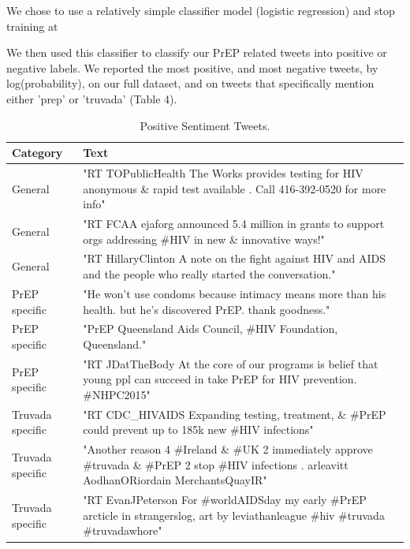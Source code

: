 \documentclass{sig-alternate-05-2015}
\begin{document}
 We chose to use a relatively simple classifier model (logistic regression) and stop training at

We then used this classifier to classify our PrEP related tweets into positive or negative labels. We reported the most positive, and most negative tweets, by log(probability), on our full dataset, and on tweets that specifically mention either 'prep' or 'truvada' (Table 4).

\begin{table}
\centering
\caption{Positive Sentiment Tweets.}
\begin{tabular}{|p{2cm}|p{12cm}|} \hline
Category & Text\\ \hline
General & "RT TOPublicHealth The Works provides testing for HIV anonymous \& rapid test available . Call 416-392-0520 for more info"\\ \hline
General & "RT FCAA ejaforg announced 5.4 million in grants to support orgs addressing \#HIV in new \& innovative ways!"\\ \hline
General & "RT HillaryClinton A note on the fight against HIV and AIDS and the people who really started the conversation."\\ \hline

PrEP specific & "He won't use condoms because intimacy means more than his health. but he's discovered PrEP. thank goodness."\\ \hline
PrEP specific & "PrEP Queensland Aids Council, \#HIV Foundation, Queensland."\\ \hline
PrEP specific & "RT JDatTheBody At the core of our programs is belief that young ppl can succeed in take PrEP for HIV prevention. \#NHPC2015"\\ \hline

Truvada specific & "RT CDC\_HIVAIDS Expanding testing, treatment, \& \#PrEP could prevent up to 185k new \#HIV infections"\\ \hline
Truvada specific & "Another reason 4 \#Ireland \& \#UK 2 immediately approve \#truvada \& \#PrEP 2 stop \#HIV infections . arleavitt AodhanORiordain MerchantsQuayIR"\\ \hline
Truvada specific & "RT EvanJPeterson For \#worldAIDSday my early \#PrEP arcticle in strangerslog, art by leviathanleague \#hiv \#truvada \#truvadawhore"\\ \hline

\hline\end{tabular}
\end{table}
\end{document}
